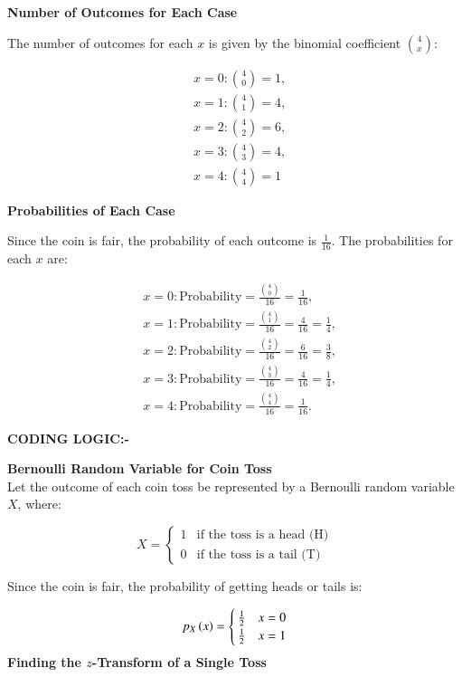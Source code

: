 \documentclass[journal]{IEEEtran}
\numberwithin{equation}{enumi}
\numberwithin{figure}{enumi}
\begin{document}
\textbf{Number of Outcomes for Each Case}

The number of outcomes for each $ x $ is given by the binomial coefficient $ \binom{4}{x} $:

\begin{align}
    &x = 0: \binom{4}{0} = 1, \\
    &x = 1: \binom{4}{1} = 4, \\
    &x = 2: \binom{4}{2} = 6, \\
    &x = 3: \binom{4}{3} = 4, \\
    &x = 4: \binom{4}{4} = 1
\end{align}

\textbf{Probabilities of Each Case}

Since the coin is fair, the probability of each outcome is $ \frac{1}{16} $. The probabilities for each $ x $ are:

\begin{align}
    &x = 0: \text{Probability} = \frac{\binom{4}{0}}{16} = \frac{1}{16}, \\
    &x = 1: \text{Probability} = \frac{\binom{4}{1}}{16} = \frac{4}{16} = \frac{1}{4}, \\
    &x = 2: \text{Probability} = \frac{\binom{4}{2}}{16} = \frac{6}{16} = \frac{3}{8}, \\
    &x = 3: \text{Probability} = \frac{\binom{4}{3}}{16} = \frac{4}{16} = \frac{1}{4}, \\
    &x = 4: \text{Probability} = \frac{\binom{4}{4}}{16} = \frac{1}{16}.
\end{align}


\textbf{CODING LOGIC:-}


\textbf{Bernoulli Random Variable for Coin Toss}\\
Let the outcome of each coin toss be represented by a Bernoulli random variable \( X \), where:

\[
X = 
\begin{cases} 
1 & \text{if the toss is a head (H)} \\
0 & \text{if the toss is a tail (T)}
\end{cases}
\]

Since the coin is fair, the probability of getting heads or tails is:

\begin{align}
  p_X\left(x\right) = \begin{cases}
    \frac{1}{2} & x = 0\\
    \frac{1}{2} & x = 1
  \end{cases}
\end{align}
\textbf{Finding the \( z \)-Transform of a Single Toss}
\end{document}

